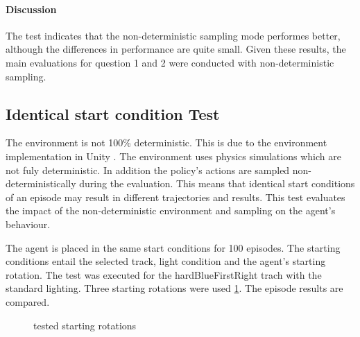 \paragraph{Discussion}
The test indicates that the non-deterministic sampling mode performes better, although the differences in performance are quite small. Given these results, the main evaluations for question 1 and 2 were conducted with non-deterministic sampling.

\subsection{Identical start condition Test}

The environment is not 100\% deterministic. This is due to the environment implementation in Unity \autocite{unity_fixed-update}. The environment uses physics simulations which are not fuly deterministic. In addition the policy's actions are sampled non-deterministically during the evaluation.
This means that identical start conditions of an episode may result in different trajectories and results. This test evaluates the impact of the non-deterministic environment and sampling on the agent's behaviour. 

The agent is placed in the same start conditions for 100 episodes. The starting conditions entail the selected track, light condition and the agent's starting rotation. The test was executed for the hardBlueFirstRight trach with the standard lighting. Three starting rotations were used \ref{fig:identical_start_conditions_test_rotations}.
The episode results are compared.

\begin{figure}
    \centering
    \caption{tested starting rotations}
    \label{fig:identical_start_conditions_test_rotations}
\end{figure}

